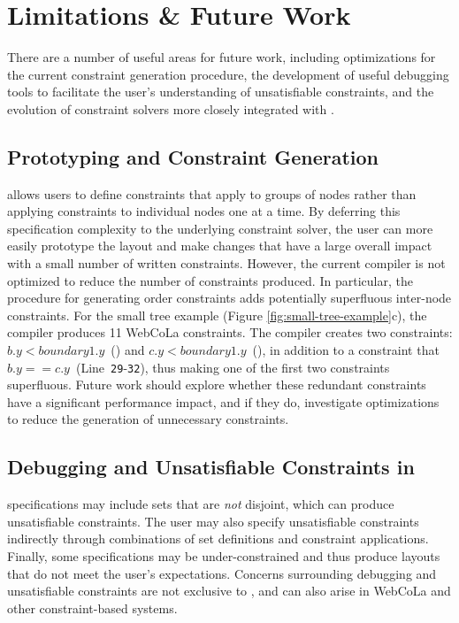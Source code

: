 \section{Limitations \& Future Work}
There are a number of useful areas for future work, including optimizations
for the current constraint generation procedure, the development of useful debugging
tools to facilitate the user's understanding of unsatisfiable constraints,
and the evolution of constraint solvers more closely integrated with \projectname.


\vspace{-5px}
\subsection{Prototyping and Constraint Generation}
\projectname allows users to define constraints that apply
to groups of nodes rather than applying constraints to individual
nodes one at a time. By deferring this specification complexity to the underlying constraint
solver, the user can more easily prototype the layout and make changes that
have a large overall impact with a small number of written constraints. However, 
the current \projectname compiler is not optimized to reduce the
number of constraints produced. In particular, the procedure for generating
order constraints adds potentially superfluous inter-node 
constraints. For the small tree example (Figure \ref{fig:small-tree-example}c), 
the \projectname compiler produces 11 WebCoLa constraints.
The \projectname compiler creates two constraints: \mbox{$b.y < boundary1.y$ ()} 
and \mbox{$c.y < boundary1.y$ ()}, in addition to a
constraint that \mbox{$b.y == c.y$ (Line~\texttt{29}-\texttt{32})}, thus 
making one of the first two constraints superfluous. 
Future work should explore whether these redundant constraints have a 
significant performance impact, and if they do, investigate 
optimizations to reduce the generation of unnecessary constraints.

\vspace{-7px}
\subsection{Debugging and Unsatisfiable Constraints in \projectname}
\projectname specifications may include sets that 
are \emph{not} disjoint, which can produce unsatisfiable constraints. 
The user may also specify unsatisfiable constraints indirectly through
combinations of set definitions and constraint applications. 
Finally, some specifications may be under-constrained and thus produce
layouts that do not meet the user's expectations. Concerns surrounding
debugging and unsatisfiable constraints are not exclusive to \projectname, 
and can also arise in WebCoLa and other constraint-based systems. 

